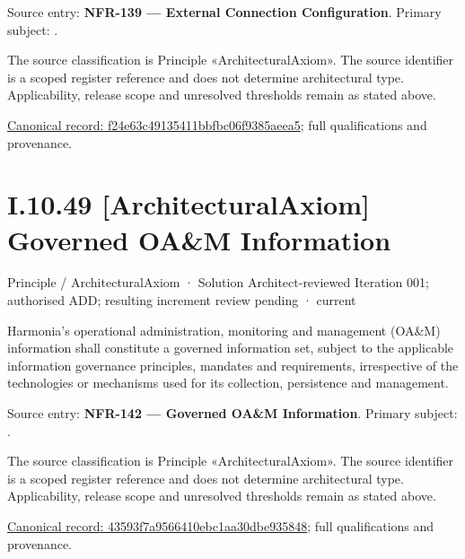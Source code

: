 Source entry: \textbf{NFR-139 — External Connection Configuration}. Primary subject: \texttt{}.



The source classification is Principle «ArchitecturalAxiom». The source identifier is a scoped register reference and does not determine architectural type. Applicability, release scope and unresolved thresholds remain as stated above.


{\footnotesize \href{../../../../../../../continuum/motivation/principle/architectural-axiom/f24e63c49135411bbfbc06f9385aeea5.md}{Canonical record: f24e63c49135411bbfbc06f9385aeea5}; full qualifications and provenance.}\par
\section*{I.10.49 [ArchitecturalAxiom] Governed OA\&M Information}
\label{navigation:I.10.49}

\label{element:43593f7a9566410ebc1aa30dbe935848}
{\small Principle / ArchitecturalAxiom · Solution Architect-reviewed Iteration 001; authorised ADD; resulting increment review pending · current}\par

Harmonia's operational administration, monitoring and management (OA\&M) information shall constitute a governed information set, subject to the applicable information governance principles, mandates and requirements, irrespective of the technologies or mechanisms used for its collection, persistence and management.



Source entry: \textbf{NFR-142 — Governed OA\&M Information}. Primary subject: \texttt{}.



The source classification is Principle «ArchitecturalAxiom». The source identifier is a scoped register reference and does not determine architectural type. Applicability, release scope and unresolved thresholds remain as stated above.


{\footnotesize \href{../../../../../../../continuum/motivation/principle/architectural-axiom/43593f7a9566410ebc1aa30dbe935848.md}{Canonical record: 43593f7a9566410ebc1aa30dbe935848}; full qualifications and provenance.}\par
